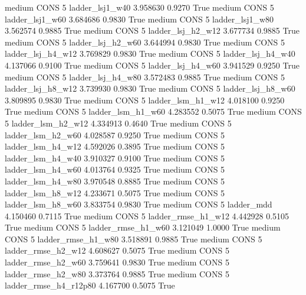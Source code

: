     medium     CONS                 5        ladder_lsj1_w40   3.958630      0.9270    True
    medium     CONS                 5        ladder_lsj1_w60   3.684686      0.9830    True
    medium     CONS                 5        ladder_lsj1_w80   3.562574      0.9885    True
    medium     CONS                 5      ladder_lsj_h2_w12   3.677734      0.9885    True
    medium     CONS                 5      ladder_lsj_h2_w60   3.644994      0.9830    True
    medium     CONS                 5      ladder_lsj_h4_w12   3.769829      0.9830    True
    medium     CONS                 5      ladder_lsj_h4_w40   4.137066      0.9100    True
    medium     CONS                 5      ladder_lsj_h4_w60   3.941529      0.9250    True
    medium     CONS                 5      ladder_lsj_h4_w80   3.572483      0.9885    True
    medium     CONS                 5      ladder_lsj_h8_w12   3.739930      0.9830    True
    medium     CONS                 5      ladder_lsj_h8_w60   3.809895      0.9830    True
    medium     CONS                 5      ladder_lsm_h1_w12   4.018100      0.9250    True
    medium     CONS                 5      ladder_lsm_h1_w60   4.283552      0.5075    True
    medium     CONS                 5      ladder_lsm_h2_w12   4.334913      0.4640    True
    medium     CONS                 5      ladder_lsm_h2_w60   4.028587      0.9250    True
    medium     CONS                 5      ladder_lsm_h4_w12   4.592026      0.3895    True
    medium     CONS                 5      ladder_lsm_h4_w40   3.910327      0.9100    True
    medium     CONS                 5      ladder_lsm_h4_w60   4.013764      0.9325    True
    medium     CONS                 5      ladder_lsm_h4_w80   3.970548      0.8885    True
    medium     CONS                 5      ladder_lsm_h8_w12   4.233671      0.5075    True
    medium     CONS                 5      ladder_lsm_h8_w60   3.833754      0.9830    True
    medium     CONS                 5             ladder_mdd   4.150460      0.7115    True
    medium     CONS                 5     ladder_rmse_h1_w12   4.442928      0.5105    True
    medium     CONS                 5     ladder_rmse_h1_w60   3.121049      1.0000    True
    medium     CONS                 5     ladder_rmse_h1_w80   3.518891      0.9885    True
    medium     CONS                 5     ladder_rmse_h2_w12   4.608627      0.5075    True
    medium     CONS                 5     ladder_rmse_h2_w60   3.759641      0.9830    True
    medium     CONS                 5     ladder_rmse_h2_w80   3.373764      0.9885    True
    medium     CONS                 5  ladder_rmse_h4_r12p80   4.167700      0.5075    True
